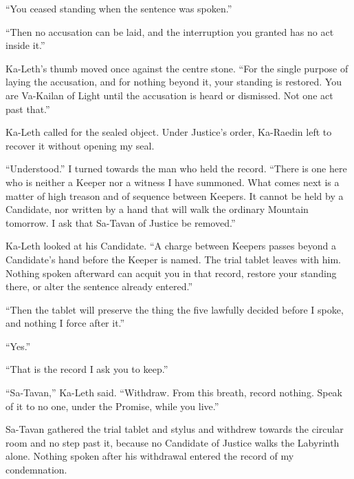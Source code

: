 ``You ceased standing when the sentence was spoken.''\par

``Then no accusation can be laid, and the interruption you granted has no act inside it.''\par

Ka-Leth's thumb moved once against the centre stone. ``For the single purpose of laying the accusation, and for nothing beyond it, your standing is restored. You are Va-Kailan of Light until the accusation is heard or dismissed. Not one act past that.''\par

Ka-Leth called for the sealed object. Under Justice's order, Ka-Raedin left to recover it without opening my seal.\par

``Understood.'' I turned towards the man who held the record. ``There is one here who is neither a Keeper nor a witness I have summoned. What comes next is a matter of high treason and of sequence between Keepers. It cannot be held by a Candidate, nor written by a hand that will walk the ordinary Mountain tomorrow. I ask that Sa-Tavan of Justice be removed.''\par

Ka-Leth looked at his Candidate. ``A charge between Keepers passes beyond a Candidate's hand before the Keeper is named. The trial tablet leaves with him. Nothing spoken afterward can acquit you in that record, restore your standing there, or alter the sentence already entered.''\par

``Then the tablet will preserve the thing the five lawfully decided before I spoke, and nothing I force after it.''\par

``Yes.''\par

``That is the record I ask you to keep.''\par

``Sa-Tavan,'' Ka-Leth said. ``Withdraw. From this breath, record nothing. Speak of it to no one, under the Promise, while you live.''\par

Sa-Tavan gathered the trial tablet and stylus and withdrew towards the circular room and no step past it, because no Candidate of Justice walks the Labyrinth alone. Nothing spoken after his withdrawal entered the record of my condemnation.\par

